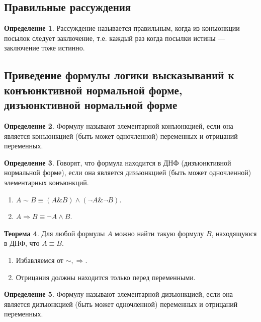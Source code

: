 \documentclass[12pt]{report}
\theoremstyle{definition}
\newtheorem{theorem}{Теорема}[chapter]
\newtheorem{definition}[theorem]{Определение}
\begin{document}
\subsection{Правильные рассуждения}
\begin{definition}
Рассуждение называется правильным, когда из конъюнкции посылок следует
заключение, т.е. каждый раз когда посылки истины --- заключение тоже истинно.
\end{definition}

\subsection
{
  Приведение формулы логики высказываний к конъюнктивной нормальной
  форме, дизъюнктивной нормальной форме
}

\begin{definition}
Формулу называют элементарной конъюнкцией, если она является
конъюнкцией (быть может одночленной) переменных и отрицаний переменных.
\end{definition}

\begin{definition}
Говорят, что формула находится в ДНФ (дизъюнктивной нормальной форме),
если она является дизъюнкцией (быть может одночленной) элементарных конъюнкций.
\end{definition}

\begin{enumerate}
\item $A \sim B \equiv (A \& B) \wedge (\neg A\& \neg B)$.
\item $A \Rightarrow B \equiv \neg A \wedge B$.
\end{enumerate}

\begin{theorem}
Для любой формулы $A$ можно найти такую формулу $B$, находящуюся в ДНФ,
что $A \equiv B$.
\end{theorem}

\begin{enumerate}
\item Избавляемся от $\sim, \Rightarrow$.
\item Отрицания должны находится только перед переменными.
\end{enumerate}

\begin{definition}
Формулу называют элементарной дизъюнкцией, если она является
дизъюнкцией (быть может одночленной) переменных и отрицаний переменных.
\end{definition}
\end{document}
